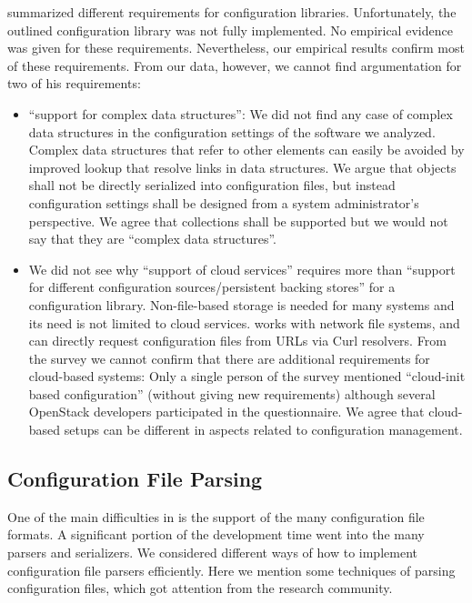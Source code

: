 \citet{denisov2015functional} summarized different requirements for configuration libraries.
Unfortunately, the outlined configuration library was not fully implemented.
No empirical evidence was given for these requirements.
Nevertheless, our empirical results confirm most of these requirements.
From our data, however, we cannot find argumentation for two of his requirements:
\begin{itemize}
\item \enquote{support for complex data structures}:
We did not find any case of complex data structures in the configuration settings of the software we analyzed.
Complex data structures that refer to other elements can easily be avoided by improved lookup that resolve links in data structures.
We argue that objects shall not be directly serialized into configuration files, but instead configuration settings shall be designed from a system administrator's perspective.
We agree that collections shall be supported but we would not say that they are ``complex data structures''.
\item We did not see why \enquote{support of cloud services} requires more than \enquote{support for different configuration sources/persistent backing stores} for a configuration library.
Non-file-based storage is needed for many systems and its need is not limited to cloud services.
\elektra{} works with network file systems, and can directly request configuration files from URLs via Curl resolvers.
From the survey we cannot confirm that there are additional requirements for cloud-based systems:
Only a single person of the survey mentioned ``cloud-init based configuration'' (without giving new requirements) although several OpenStack developers participated in the questionnaire.
We agree that cloud-based setups can be different in aspects related to configuration management.
\end{itemize}

\subsection{Configuration File Parsing}

One of the main difficulties in \elektra{} is the support of the many configuration file formats.
A significant portion of the development time went into the many parsers and serializers.
We considered different ways of how to implement configuration file parsers efficiently.
Here we mention some techniques of parsing configuration files, which got attention from the research community.

